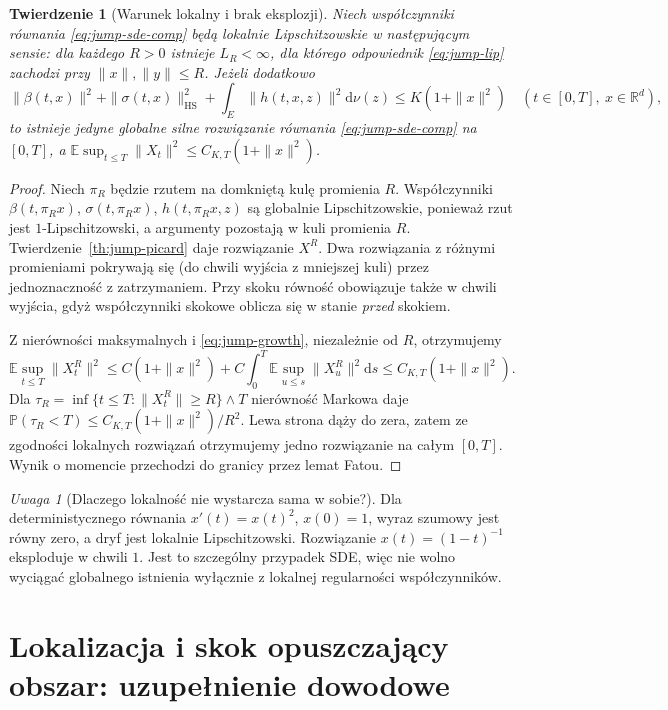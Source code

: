 \documentclass[11pt,a4paper,oneside]{report}
\numberwithin{equation}{chapter}
\theoremstyle{plain}
\newtheorem{twierdzenie}{Twierdzenie}[chapter]
\theoremstyle{definition}
\theoremstyle{remark}
\newtheorem{uwaga}{Uwaga}[chapter]
\newcommand{\R}{\mathbb{R}}
\newcommand{\Prob}{\mathbb{P}}
\newcommand{\E}{\mathbb{E}}
\newcommand{\dd}{\mathrm{d}}
\begin{document}
\begin{twierdzenie}[Warunek lokalny i brak eksplozji]\label{thm:volIII:13:03}
\label{th:jump-local-explosion}
Niech współczynniki równania \eqref{eq:jump-sde-comp}
będą lokalnie Lipschitzowskie w następującym sensie:
dla każdego $R>0$ istnieje $L_R<\infty$, dla którego
odpowiednik \eqref{eq:jump-lip} zachodzi przy
$\|x\|,\|y\|\le R$. Jeżeli dodatkowo
\[
 \|\beta(t,x)\|^2+\|\sigma(t,x)\|_{\mathrm{HS}}^2
 +\int_E\|h(t,x,z)\|^2\dd\nu(z)
 \le K(1+\|x\|^2)
 \quad(t\in[0,T],\ x\in\R^d),
 \tag{13.8}\label{eq:jump-growth}
\]
to istnieje jedyne globalne silne rozwiązanie równania
\eqref{eq:jump-sde-comp} na $[0,T]$, a
$\E\sup_{t\le T}\|X_t\|^2\le C_{K,T}(1+\|x\|^2)$.
\end{twierdzenie}
\begin{proof}
Niech $\pi_R$ będzie rzutem na domkniętą kulę promienia
$R$. Współczynniki $\beta(t,\pi_Rx)$,
$\sigma(t,\pi_Rx)$, $h(t,\pi_Rx,z)$ są globalnie
Lipschitzowskie, ponieważ rzut jest $1$-Lipschitzowski,
a argumenty pozostają w kuli promienia $R$.
Twierdzenie~\ref{th:jump-picard} daje rozwiązanie $X^R$.
Dwa rozwiązania z różnymi promieniami pokrywają się
(do chwili wyjścia z mniejszej kuli) przez jednoznaczność
z zatrzymaniem. Przy skoku równość obowiązuje także
w chwili wyjścia, gdyż współczynniki skokowe oblicza się
w stanie \emph{przed} skokiem.

Z nierówności maksymalnych i \eqref{eq:jump-growth},
niezależnie od $R$, otrzymujemy
\[
 \E\sup_{t\le T}\|X^R_t\|^2
 \le C(1+\|x\|^2)+C\int_0^T
 \E\sup_{u\le s}\|X^R_u\|^2\dd s
 \le C_{K,T}(1+\|x\|^2).
\]
Dla $\tau_R=\inf\{t\le T:\|X^R_t\|\ge R\}\wedge T$
nierówność Markowa daje
$\Prob(\tau_R<T)\le C_{K,T}(1+\|x\|^2)/R^2$.
Lewa strona dąży do zera, zatem ze zgodności lokalnych
rozwiązań otrzymujemy jedno rozwiązanie na całym $[0,T]$.
Wynik o momencie przechodzi do granicy przez lemat Fatou.
\end{proof}

\begin{uwaga}[Dlaczego lokalność nie wystarcza sama w sobie?]
Dla deterministycznego równania $x'(t)=x(t)^2$, $x(0)=1$,
wyraz szumowy jest równy zero, a dryf jest lokalnie
Lipschitzowski. Rozwiązanie $x(t)=(1-t)^{-1}$ eksploduje
w chwili $1$. Jest to szczególny przypadek SDE, więc
nie wolno wyciągać globalnego istnienia wyłącznie z
lokalnej regularności współczynników.
\end{uwaga}


\section{Lokalizacja i skok opuszczający obszar: uzupełnienie dowodowe}\label{sec:volIII:13:05}
\end{document}
